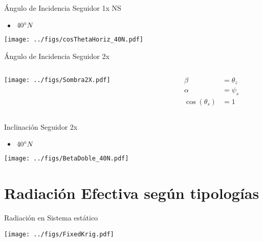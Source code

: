 \documentclass[aspectratio=169, usenames,svgnames,dvipsnames]{beamer}
\begin{document}
\begin{frame}[label={sec:org3d9a668}]{Ángulo de Incidencia Seguidor 1x NS}
\begin{itemize}
\item \(40\degree N\)
\end{itemize}
\begin{center}
\texttt{[image: ../figs/cosThetaHoriz\_40N.pdf]}
\end{center}
\end{frame}




\begin{frame}[label={sec:orgb43583b},plain]{Ángulo de Incidencia Seguidor 2x}
\begin{columns}
\begin{column}{0.8\columnwidth}
\begin{center}
\texttt{[image: ../figs/Sombra2X.pdf]}
\end{center}
\end{column}

\begin{column}{0.2\columnwidth}
\begin{align*}
  \beta &= \theta_{z}\\
  \alpha &= \psi_{s}\\
  \cos(\theta_{s}) &= 1
\end{align*}
\end{column}
\end{columns}
\end{frame}
\begin{frame}[label={sec:org3f3946b}]{Inclinación Seguidor 2x}
\begin{itemize}
\item \(40\degree N\)
\end{itemize}
\begin{center}
\texttt{[image: ../figs/BetaDoble\_40N.pdf]}
\end{center}
\end{frame}


\section{Radiación Efectiva según tipologías}
\label{sec:org7a16ddc}

\begin{frame}[label={sec:org713b3be}]{Radiación en Sistema estático}
\begin{center}
\texttt{[image: ../figs/FixedKrig.pdf]}
\end{center}
\end{frame}
\end{document}
